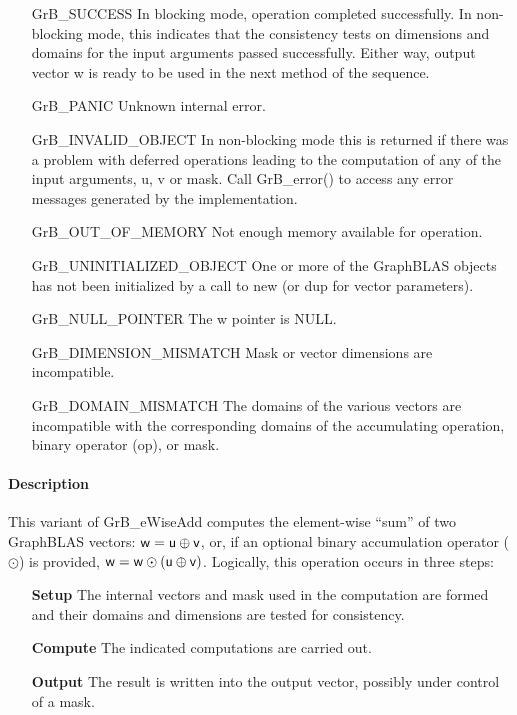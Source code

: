 \begin{itemize}[leftmargin=2.1in]
    \item[{\sf GrB\_SUCCESS}]         In blocking mode, operation
	completed successfully. In non-blocking mode, this indicates
	that the consistency tests on dimensions and domains for the
	input arguments passed successfully. Either way, output vector
	{\sf w} is ready to be used in the next method of the sequence.

    \item[{\sf GrB\_PANIC}]           Unknown internal error.
    
    \item[{\sf GrB\_INVALID\_OBJECT}] In non-blocking mode this is returned if
    there was a problem with deferred operations leading to the computation of
    any of the input arguments, {\sf u}, {\sf v} or {\sf mask}.  Call 
    {GrB\_error()} to access any error messages generated by the implementation.

    \item[{\sf GrB\_OUT\_OF\_MEMORY}]        Not enough memory available for operation.
    
    \item[{\sf GrB\_UNINITIALIZED\_OBJECT}] One or more of the GraphBLAS objects 
    has not been initialized by a call to {\sf new} (or {\sf dup} for vector
    parameters).
    
    \item[{\sf GrB\_NULL\_POINTER}]  The {\sf w} pointer is {\sf NULL}.

    \item[{\sf GrB\_DIMENSION\_MISMATCH}] Mask or vector dimensions are incompatible.

	\item[{\sf GrB\_DOMAIN\_MISMATCH}]    The domains of the various
	vectors are incompatible with the corresponding domains of the
	accumulating operation, binary operator ({\sf op}), or mask.
\end{itemize}

\paragraph{Description}

This variant of {\sf GrB\_eWiseAdd} computes the element-wise ``sum'' of
two GraphBLAS vectors: ${\sf w} = {\sf u} \oplus {\sf v}$, or, if an optional
binary accumulation operator ($\odot$) is provided, ${\sf w} = {\sf w} \odot
\left({\sf u} \oplus {\sf v}\right)$.  Logically, this operation occurs in
three steps:
\begin{enumerate}[leftmargin=0.75in]
\item[\bf Setup] The internal vectors and mask used in the computation are formed 
and their domains and dimensions are tested for consistency.
\item[\bf Compute] The indicated computations are carried out.
\item[\bf Output] The result is written into the output vector, possibly under 
control of a mask.
\end{enumerate}

